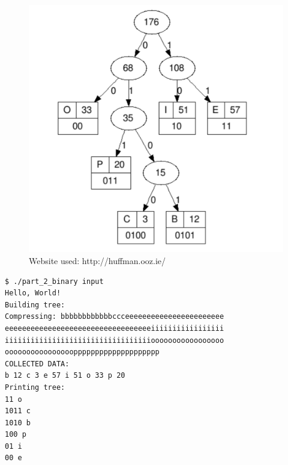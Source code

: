 \documentclass[a4paper, 12pt]{article}
\begin{document}
\begin{figure}
    \centering
    \includegraphics[width=1\textwidth]{huffman_1}
    \caption{Website used: http://huffman.ooz.ie/}
\end{figure}

\begin{lstlisting}[caption=Program output]
$ ./part_2_binary input
Hello, World!
Building tree:
Compressing: bbbbbbbbbbbbccceeeeeeeeeeeeeeeeeeeeeee
eeeeeeeeeeeeeeeeeeeeeeeeeeeeeeeeeeiiiiiiiiiiiiiiiii
iiiiiiiiiiiiiiiiiiiiiiiiiiiiiiiiiiooooooooooooooooo
oooooooooooooooopppppppppppppppppppp
COLLECTED DATA:
b 12 c 3 e 57 i 51 o 33 p 20
Printing tree:
11 o
1011 c
1010 b
100 p
01 i
00 e
\end{lstlisting}
\end{document}
